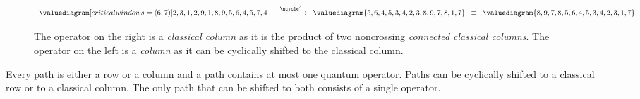 \begin{figure}[htpb]
    \centering
    \begin{equation*}
        \begin{array}{c}
            \valuediagram[ critical windows={(6,7)}]{{2,3},{1,2},{9,1},{8,9},{5,6},{4,5},{7,4}}
        \end{array}
        \xrightarrow{~~\ncycle^3~}
        \begin{array}{c}
            \valuediagram{{5,6},{4,5},{3,4},{2,3},{8,9},{7,8},{1,7}}
        \end{array}
        \equiv
        \begin{array}{c}
            \valuediagram{{8,9},{7,8},{5,6},{4,5},{3,4},{2,3},{1,7}}
        \end{array}
    \end{equation*}
    \caption{The operator on the right is a \emph{classical column} as it is the product
        of two noncrossing \emph{connected classical columns}.
        The operator on the left is a \emph{column} as it can be cyclically
    shifted to the classical column.}
    \label{fig:column-vs-classical-column}
\end{figure}

\begin{theorem}
   \label{thm:quantum_path}
    Every path is either a row or a column and a path contains at most one quantum operator.
    Paths can be cyclically shifted to a classical row or to a classical column.
    The only path that can be shifted to both consists of a single operator.
\end{theorem}

